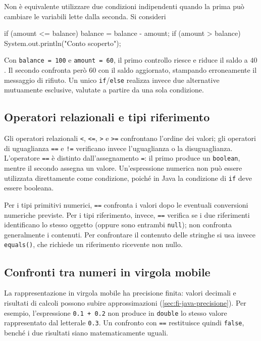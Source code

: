 Non è equivalente utilizzare due condizioni indipendenti
quando la prima può cambiare le variabili lette dalla
seconda. Si consideri

\begin{unipdcode}[language=Java]
if (amount <= balance) {
    balance = balance - amount;
}
if (amount > balance) {
    System.out.println("Conto scoperto");
}
\end{unipdcode}

Con \texttt{balance = 100} e \texttt{amount = 60}, il
primo controllo riesce e riduce il saldo a \(40\). Il
secondo confronta però \(60\) con il saldo aggiornato,
stampando erroneamente il messaggio di rifiuto. Un unico
\texttt{if}/\texttt{else} realizza invece due alternative
mutuamente esclusive, valutate a partire da una sola
condizione.

\subsection{Operatori relazionali e tipi riferimento}
\label{sec:fi-java-classi-confronti}

Gli operatori relazionali \texttt{<}, \texttt{<=},
\texttt{>} e \texttt{>=} confrontano l'ordine dei valori;
gli operatori di uguaglianza \texttt{==} e \texttt{!=}
verificano invece l'uguaglianza o la disuguaglianza.
L'operatore \texttt{==} è distinto dall'assegnamento
\texttt{=}: il primo produce un \texttt{boolean},
mentre il secondo assegna un valore. Un'espressione numerica non può essere
utilizzata direttamente come condizione, poiché in Java
la condizione di \texttt{if} deve essere booleana.

Per i tipi primitivi numerici, \texttt{==} confronta i
valori dopo le eventuali conversioni numeriche previste.
Per i tipi riferimento, invece, \texttt{==} verifica se
i due riferimenti identificano lo stesso oggetto (oppure
sono entrambi \texttt{null}); non confronta generalmente
i contenuti. Per confrontare il contenuto delle stringhe
si usa invece
\texttt{equals()}, che richiede un riferimento ricevente non nullo.

\clearpage

\subsection{Confronti tra numeri in virgola mobile}
\label{sec:fi-java-classi-floating}

La rappresentazione in virgola mobile ha precisione
finita: valori decimali e risultati di calcoli possono
subire approssimazioni
(\cref{sec:fi-java-precisione}).
Per esempio, l'espressione \texttt{0.1 + 0.2} non
produce in \texttt{double} lo stesso valore
rappresentato dal letterale \texttt{0.3}. Un confronto
con \texttt{==} restituisce quindi \texttt{false},
benché i due risultati siano matematicamente uguali.

